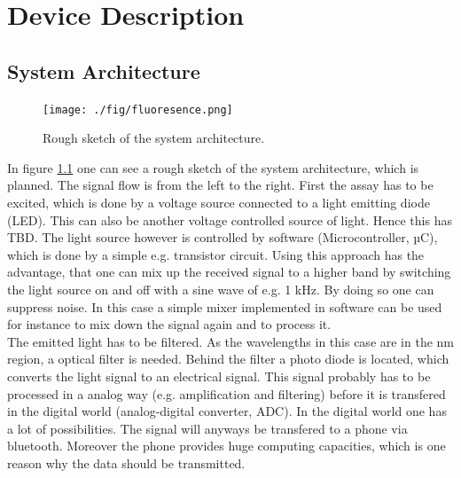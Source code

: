 \documentclass{report}
\newcommand{\newpar}{\vspace{1em}\\}
\begin{document}



\pagestyle{fancy}

\tableofcontents
\listoffigures
\newpage
\listoftables

\newpage
\setcounter{roman}{\value{page}}
\setcounter{page}{1}

\chapter{Device Description}
\section{System Architecture}
\begin{figure}[H]
	\texttt{[image: ./fig/fluoresence.png]}
	\caption{Rough sketch of the system architecture.}
	\label{fig:block}
\end{figure}
In figure \ref{fig:block} one can see a rough sketch of the system architecture, which is planned. The signal flow is from the left to the right. First the assay has to be excited, which is done by a voltage source connected to a light emitting diode (LED). This can also be another voltage controlled source of light. Hence this has TBD. The light source however is controlled by software (Microcontroller, µC), which is done by a simple e.g. transistor circuit. Using this approach has the advantage, that one can mix up the received signal to a higher band by switching the light source on and off with a sine wave of e.g. 1 kHz. By doing so one can suppress noise. In this case a simple mixer implemented in software can be used for instance to mix down the signal again and to process it.  
\newpar
The emitted light has to be filtered. As the wavelengths in this case are in the nm region, a optical filter is needed. Behind the filter a photo diode is located, which converts the light signal to an electrical signal. This signal probably has to be processed in a analog way (e.g. amplification and filtering) before it is transfered in the digital world (analog-digital converter, ADC). In the digital world one has a lot of possibilities. The signal will anyways be transfered to a phone via bluetooth. Moreover the phone provides huge computing capacities, which is one reason why the data should be transmitted.  
\end{document}
